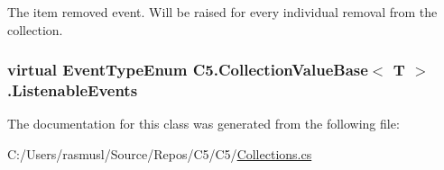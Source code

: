 The item removed event. Will be raised for every individual removal from the collection. 

\hypertarget{class_c5_1_1_collection_value_base_a5e6697e40d1421280e34fe47ebbdcefc}{}
\subsubsection[{Listenable\+Events}]{\setlength{\rightskip}{0pt plus 5cm}virtual {\bf Event\+Type\+Enum} {\bf C5.\+Collection\+Value\+Base}$<$ T $>$.Listenable\+Events\hspace{0.3cm}{\ttfamily [get]}}\label{class_c5_1_1_collection_value_base_a5e6697e40d1421280e34fe47ebbdcefc}






The documentation for this class was generated from the following file\+:\begin{DoxyCompactItemize}
\item 
C\+:/\+Users/rasmusl/\+Source/\+Repos/\+C5/\+C5/\hyperlink{_collections_8cs}{Collections.\+cs}\end{DoxyCompactItemize}
